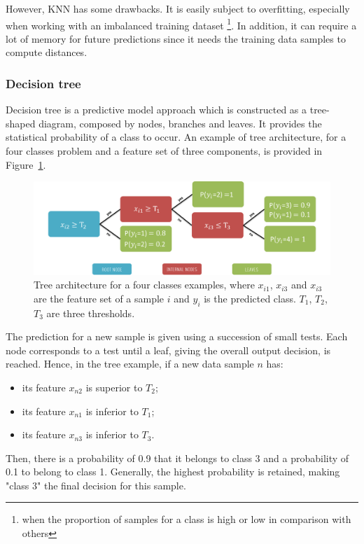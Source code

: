 \documentclass[a4paper,10pt]{article}
\begin{document}
However, KNN has some drawbacks. It is easily subject to overfitting, especially when working with an imbalanced training dataset \footnote{when the proportion of samples for a class is high or low in comparison with others}. In addition, it can require a lot of memory for future predictions since it needs the training data samples to compute distances.

\subsubsection{Decision tree}
\label{DT}
Decision tree is a predictive model approach which is constructed as a tree-shaped diagram, composed by nodes, branches and leaves. It provides the statistical probability of a class to occur. An example of tree architecture, for a four classes problem and a feature set of three components, is provided in Figure~\ref{TreeEx}.

\begin{figure}[htbp]
\centerline{\includegraphics[width=0.8\linewidth]{./figures/DT.png}}
\caption{Tree architecture for a four classes examples, where $x_{i1}$, $x_{i3}$ and $x_{i3}$ are the feature set of a sample $i$ and $y_i$ is the predicted class. $T_1$, $T_2$, $T_3$ are three thresholds.}
\label{TreeEx}
\end{figure}

The prediction for a new sample is given using a succession of small tests. Each node corresponds to a test until a leaf, giving the overall output decision, is reached. Hence, in the tree example, if a new data sample $n$ has:
\begin{itemize}
\item its feature $x_{n2}$ is superior to $T_2$;
\item its feature $x_{n1}$ is inferior to $T_1$; 
\item its feature $x_{n3}$ is inferior to $T_3$.
\end{itemize}
Then, there is a probability of 0.9 that it belongs to class 3 and a probability of 0.1 to belong to class 1. Generally, the highest probability is retained, making "class 3" the final decision for this sample.
\end{document}
